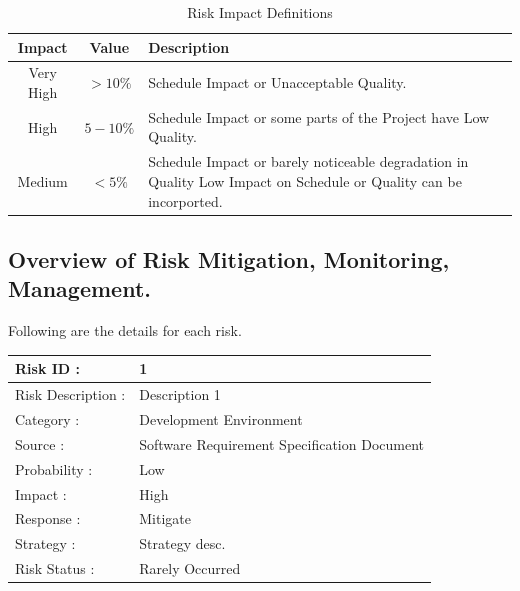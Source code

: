 \documentclass{report} %
\begin{document}
			\begin{table}[H]
				\centering
				\renewcommand{\arraystretch}{1.5}
				\begin{tabular}{|c|c|p{8cm}|}
					\hline
					\textbf{Impact} & \textbf{Value} & \hspace*{2.5cm} \textbf{Description} \\
					\hline
					Very High & $ > 10 \% $ & Schedule Impact or Unacceptable Quality. \\
					\hline
					High & $ 5 - 10 \% $ & Schedule Impact or some parts of the Project have Low Quality. \\
					\hline
					Medium & $ < 5 \% $ & Schedule Impact or barely noticeable degradation in Quality Low Impact on Schedule or Quality can be incorported. \\
					\hline
				\end{tabular}
				\caption{Risk Impact Definitions}
			\end{table}
			
			\subsection{Overview of Risk Mitigation, Monitoring, Management.}
			Following are the details for each risk. \\
			
			\begin{table}[H]
				\centering
				\renewcommand{\arraystretch}{1.5}
				\begin{tabular}{|l|p{8cm}|}
					\hline
					Risk ID : & 1 \\
					\hline
					Risk Description : & Description 1 \\
					\hline
					Category : & Development Environment \\
					\hline
					Source : & Software Requirement Specification Document \\
					\hline
					Probability : & Low \\
					\hline
					Impact : & High \\
					\hline
					Response : & Mitigate \\
					\hline
					Strategy : & Strategy desc. \\
					\hline
					Risk Status : & Rarely Occurred \\
					\hline
				\end{tabular}
			\end{table}
		
\end{document}
